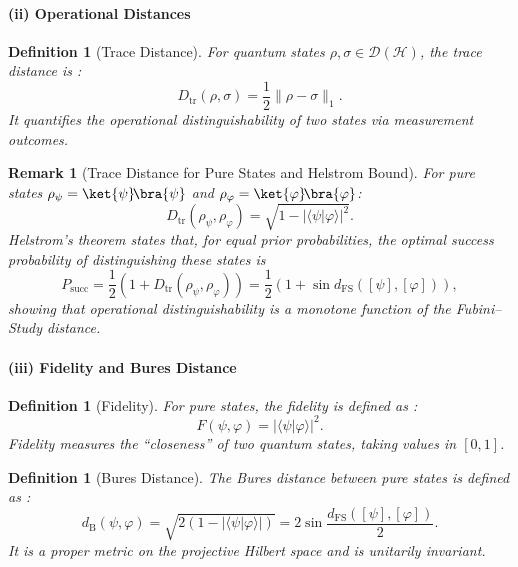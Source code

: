 \documentclass[aps,pra,reprint,nofootinbib,showpacs,superscriptaddress]{revtex4-1}
\newtheorem{definition}[theorem]{Definition}
\newtheorem{remark}[theorem]{Remark}
\begin{document}
\paragraph{(ii) Operational Distances}

\begin{definition}[Trace Distance]
For quantum states $\rho,\sigma \in \mathcal{D}(\mathcal{H})$, the \emph{trace distance} is
\cite{nielsen2010quantum,Holevo2011}:
\[
D_{\mathrm{tr}}(\rho,\sigma) = \frac12 \|\rho-\sigma\|_1.
\]
It quantifies the operational distinguishability of two states via measurement outcomes.
\end{definition}

\begin{remark}[Trace Distance for Pure States and Helstrom Bound]
For pure states $\rho_\psi=\ket{\psi}\!\bra{\psi}$ and $\rho_\varphi=\ket{\varphi}\!\bra{\varphi}$:
\[
D_{\mathrm{tr}}(\rho_\psi,\rho_\varphi) = \sqrt{1 - |\langle\psi|\varphi\rangle|^2}.
\]
Helstrom’s theorem \cite{helstrom1969quantum} states that, for equal prior probabilities, the optimal success probability of distinguishing these states is
\[
P_{\mathrm{succ}} = \frac12 \left(1 + D_{\mathrm{tr}}(\rho_\psi,\rho_\varphi)\right)
= \frac12 \left(1 + \sin d_{\mathrm{FS}}([\psi],[\varphi])\right),
\]
showing that operational distinguishability is a monotone function of the Fubini–Study distance.
\end{remark}

\paragraph{(iii) Fidelity and Bures Distance}

\begin{definition}[Fidelity]
For pure states, the \emph{fidelity} is defined as \cite{Uhlmann1976}:
\[
F(\psi,\varphi) = |\langle\psi|\varphi\rangle|^2.
\]
Fidelity measures the “closeness” of two quantum states, taking values in $[0,1]$.
\end{definition}

\begin{definition}[Bures Distance]\label{def:bures}
The \emph{Bures distance} between pure states is defined as \cite{Bures1969}:
\[
d_{\mathrm{B}}(\psi,\varphi) = \sqrt{2\left(1-|\langle\psi|\varphi\rangle|\right)}
= 2\sin\frac{d_{\mathrm{FS}}([\psi],[\varphi])}{2}.
\]
It is a proper metric on the projective Hilbert space and is unitarily invariant.
\end{definition}
\end{document}
